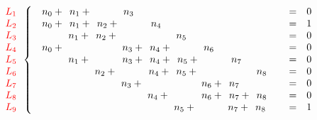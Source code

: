 \documentclass[10pt,a2paper]{article}
\begin{document}
\vspace{2em}
${\color{red}\begin{array}{c} L_1\\ L_2\\ L_3\\ L_4\\ L_5\\ L_6\\ L_7\\L_8\\L_9\end{array}    }
\left\{\begin{array}{l c l}\phantom{0}n_{0} +\phantom{0}n_{1} +\phantom{0 n_{2} +\ } \phantom{0}n_{3} \phantom{+\ 0n_{4} +\ } \phantom{ 0n_{5} +\ } \phantom{ 0n_{6} +\ } \phantom{ 0n_{7} +\ } \phantom{ 0n_{8} +\ }&=& 0\\\phantom{0}n_{0} +\phantom{0}n_{1} +\phantom{0}n_{2} +\phantom{ 0n_{3} +\ } \phantom{0}n_{4}\phantom{ +\  0n_{5} +\ } \phantom{ 0n_{6} +\ } \phantom{ 0n_{7} +\ } \phantom{ 0n_{8} +\ }&=& 1\\\phantom{ 0n_{0} +\ } \phantom{0}n_{1} +\phantom{0}n_{2} +\phantom{ 0n_{3} +\ } \phantom{ 0n_{4} +\ } \phantom{0}n_{5} \phantom{+\ 0n_{6} +\ } \phantom{ 0n_{7} +\ } \phantom{ 0n_{8} +\ }&=& 0\\\phantom{0}n_{0} +\phantom{ 0n_{1} +\ } \phantom{ 0n_{2} +\ } \phantom{0}n_{3} +\phantom{0}n_{4} +\phantom{ 0n_{5} +\ } \phantom{0}n_{6} \phantom{+\ 0n_{7} +\ } \phantom{ 0n_{8} +\ }&=& 0\\\phantom{ 0n_{0} +\ } \phantom{0}n_{1} +\phantom{ 0n_{2} +\ } \phantom{0}n_{3} +\phantom{0}n_{4} +\phantom{0}n_{5} +\phantom{ 0n_{6} +\ } \phantom{0}n_{7} \phantom{+\ 0n_{8} +\ }&=& 0\\\phantom{ 0n_{0} +\ } \phantom{ 0n_{1} +\ } \phantom{0}n_{2} +\phantom{ 0n_{3} +\ } \phantom{0}n_{4} +\phantom{0}n_{5} +\phantom{ 0n_{6} +\ } \phantom{ 0n_{7} +\ } \phantom{0}n_{8} &=& 0\\\phantom{ 0n_{0} +\ } \phantom{ 0n_{1} +\ } \phantom{ 0n_{2} +\ } \phantom{0}n_{3} +\phantom{ 0n_{4} +\ } \phantom{ 0n_{5} +\ } \phantom{0}n_{6} +\phantom{0}n_{7} \phantom{+\ 0n_{8} +\ }&=& 0\\\phantom{ 0n_{0} +\ } \phantom{ 0n_{1} +\ } \phantom{ 0n_{2} +\ } \phantom{ 0n_{3} +\ } \phantom{0}n_{4} +\phantom{ 0n_{5} +\ } \phantom{0}n_{6} +\phantom{0}n_{7} +\phantom{0}n_{8} &=& 0\\\phantom{ 0n_{0} +\ } \phantom{ 0n_{1} +\ } \phantom{ 0n_{2} +\ } \phantom{ 0n_{3} +\ } \phantom{ 0n_{4} +\ } \phantom{0}n_{5} +\phantom{ 0n_{6} +\ } \phantom{0}n_{7} +\phantom{0}n_{8} &=& 1\\\end{array}\right.$
\end{document}
